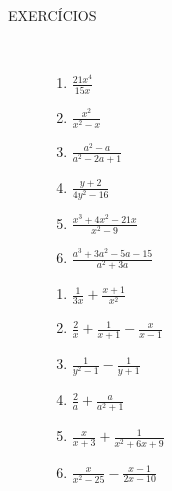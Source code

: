 \begin{description}
\item [EXERCÍCIOS \thesubsection]~~

\begin{enumerate}[label=\thesubsection.\arabic*]
    
    \begin{multicols}{3}{\large
        \begin{enumerate} [label=\alph*)]
            \item $\frac{21x^4}{15x}$
            
            \item $\frac{x^2}{x^2-x}$
            
            \item $\frac{a^2-a}{a^2-2a+1}$
            
            \item $\frac{y+2}{4y^2-16}$
            
            \item $\frac{x^3+4x^2-21x}{x^2-9}$
            
            \item $\frac{a^3+3a^2-5a-15}{a^2+3a}$
        \end{enumerate}
    }\end{multicols}
    
    
    \begin{multicols}{3}{\large
        \begin{enumerate} [label=\alph*)]
            \item $\frac{1}{3x} + \frac{x+1}{x^2}$
            
            \item $\frac{2}{x} + \frac{1}{x+1} - \frac{x}{x-1}$
            
            \item $\frac{1}{y^2-1} - \frac{1}{y+1}$
            
            \item $\frac{2}{a} + \frac{a}{a^2+1}$
            
            \item $\frac{x}{x+3} + \frac{1}{x^2+6x+9}$
            
            \item $\frac{x}{x^2-25} - \frac{x-1}{2x-10}$
        \end{enumerate}
    }\end{multicols}
    

\end{enumerate}
\end{description}
